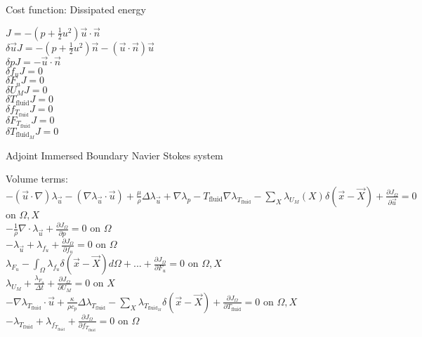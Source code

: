 \documentclass[10pt]{article} %
\begin{document}
\begin{center}
\begin{flushleft}
	Cost function: Dissipated energy
\end{flushleft}
	$J = - \left(p + \frac{1}{2}u^2\right)\vec{u}\cdot \vec{n}$\\
	$\delta \vec{u} J  = - \left(p + \frac{1}{2}u^2\right)\vec{n} - \left(\vec{u}\cdot \vec{n}\right)\vec{u}$\\
	$\delta p  J =- \vec{u}\cdot \vec{n} $\\
	$\delta f_u J = 0$\\
	$\delta F_u J = 0$\\
	$\delta U_M J = 0$\\
	$\delta T_{\text{fluid}} J = 0$\\
	$\delta f_{T_{\text{fluid}}} J = 0$\\
	$\delta F_{T_{\text{fluid}}} J = 0$\\
	$\delta T_{\text{fluid}_M} J = 0$
\newpage
\fontsize{10}{8}
\begin{flushleft}
	Adjoint Immersed Boundary Navier Stokes system
\end{flushleft}
Volume terms:\\
	$-(\vec{u}\cdot\nabla) \lambda_{\vec{u}} - \left(\nabla \lambda_{\vec{u}} \cdot \vec{u}\right) + \frac{\mu}{\rho} \Delta \lambda_{\vec{u}} + \nabla\lambda_p - T_{\text{fluid}} \nabla \lambda_{T_{\text{fluid}}} - \sum_X \lambda_{U_M}(X) \delta(\vec{x}-\vec{X}) + \frac{\partial J_{\Omega}}{\partial \vec{u}} = 0$ \quad on $\Omega,X$\\
	$-\frac{1}{\rho} \nabla \cdot \lambda_{\vec{u}} + \frac{\partial J_{\Omega}}{\partial p} = 0$ \quad on $\Omega$\\
	$-\lambda_{\vec{u}} + \lambda_{f_u} + \frac{\partial J_{\Omega}}{\partial f_u} = 0$ \quad on $\Omega$\\
	$\lambda_{F_u} - \int_{\Omega} \lambda_{f_u} \delta (\vec{x}-\vec{X}) d\Omega + ... + \frac{\partial J_{\Omega}}{\partial F_u} = 0$ \quad on $\Omega,X$\\
	$\lambda_{U_M} + \frac{\lambda_{F_u}}{\Delta t} + \frac{\partial J_{\Omega}}{\partial U_M} = 0$ \quad on $X$\\
	$-\nabla \lambda_{T_{\text{fluid}}} \cdot \vec{u} + \frac{\kappa}{\rho c_p} \Delta  \lambda_{T_{\text{fluid}}} - \sum_{X} \lambda_{T_{\text{fluid}_M}} \delta (\vec{x}-\vec{X}) + \frac{\partial J_{\Omega}}{\partial T_{\text{fluid}}} = 0$ \quad on $\Omega,X$\\
	$- \lambda_{T_{\text{fluid}}} +\lambda_{f_{T_{\text{fluid}}}} + \frac{\partial J_{\Omega}}{\partial f_{T_{\text{fluid}}}} = 0$ \quad on $\Omega$\\

\end{center}
\end{document}

